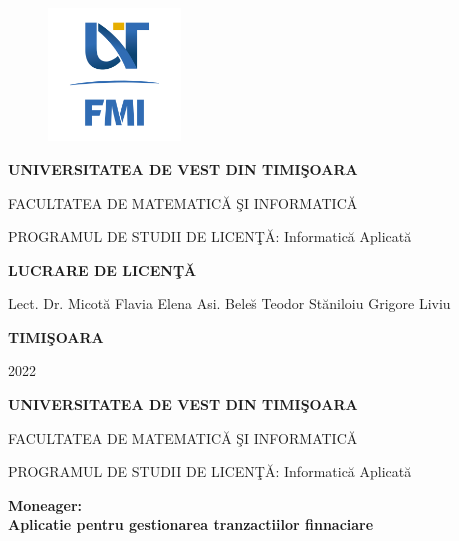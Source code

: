 \documentclass[12pt,a4paper]{report}
\theoremstyle{definition}
\theoremstyle{remark}
\begin{document}
\thispagestyle{empty}
\begin{center}
\begin{figure}[h!]
\vspace{-20pt}
\begin{center}
\includegraphics[width=100pt]{FMI-03.png}
\end{center}
\end{figure}



\newcommand{\Ltitle}{Aplicatie pentru gestionarea tranzactiilor finnaciare}

{\large{\bf UNIVERSITATEA DE VEST DIN TIMI\c SOARA \

FACULTATEA DE MATEMATIC\u A \c SI INFORMATIC\u A 

PROGRAMUL DE STUDII DE LICEN\c T\u A: 
Informatic\u a Aplicat\u a}}

\vspace{120pt}
{\huge {\bf LUCRARE DE LICEN\c T\u A}}

\vspace{150pt}
\end{center}

{\large{}

\noindent Lect. Dr. Micot\u a Flavia Elena \newline Asi. Bele\u s Teodor  \hfill St\u aniloiu Grigore Liviu}

\vfill
\begin{center}
{\bf TIMI\c SOARA

2022}
\end{center}
\newpage
\thispagestyle{empty}
\begin{center}
{\large{\bf UNIVERSITATEA DE VEST DIN TIMI\c SOARA

FACULTATEA DE MATEMATIC\u A \c SI INFORMATIC\u A

PROGRAMUL DE STUDII DE LICEN\c T\u A: Informatic\u a Aplicat\u a}}

\vspace{120pt}
{\huge {\bf Moneager:\\Aplicatie pentru gestionarea tranzactiilor finnaciare}}

\vspace{150pt}
\end{center}
\end{document}
